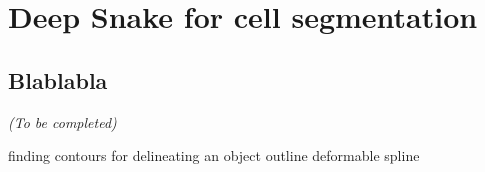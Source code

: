 
\graphicspath{{../../figures/appendix/}}

\chapter{Deep Snake for cell segmentation}
\label{ch:deep_snake_appendix}

\newpage

\section{Blablabla}
\label{sec:blablabla_deep_snake_appendix}

\begin{center}
	\textit{(To be completed)}
\end{center}

finding contours
for delineating an object outline
deformable spline




